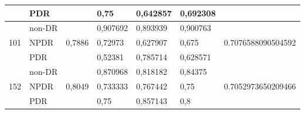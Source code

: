 \begin{table}[h!]
\begin{center}
\begin{tabular}{|c|l|c|l|l|l|c|}
                                  & PDR                        &                         & 0,75                      & 0,642857                 & 0,692308                &                                     \\ \hline
            \multirow{3}{*}{101}  & non-DR                     & \multirow{3}{*}{0,7886} & 0,907692                  & 0,893939                 & 0,900763                & \multirow{3}{*}{0.7076588090504592} \\ \cline{2-2} \cline{4-6}
                                  & NPDR                       &                         & 0,72973                   & 0,627907                 & 0,675                   &                                     \\ \cline{2-2} \cline{4-6}
                                  & PDR                        &                         & 0,52381                   & 0,785714                 & 0,628571                &                                     \\ \hline
            \multirow{3}{*}{152}  & non-DR                     & \multirow{3}{*}{0,8049} & 0,870968                  & 0,818182                 & 0,84375                 & \multirow{3}{*}{0.7052973650209466} \\ \cline{2-2} \cline{4-6}
                                  & NPDR                       &                         & 0,733333                  & 0,767442                 & 0,75                    &                                     \\ \cline{2-2} \cline{4-6}
                                  & PDR                        &                         & 0,75                      & 0,857143                 & 0,8                     &                                     \\ \hline
            \end{tabular}
        \end{center}
    \end{table}
    
